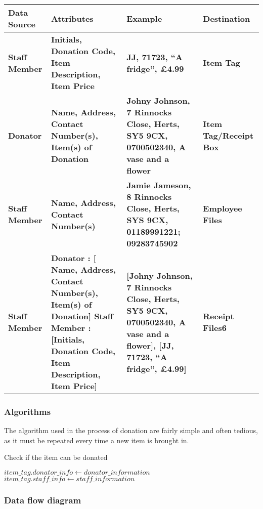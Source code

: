     \begin{tabular}{|p{3cm}|p{4cm}|p{4cm}|p{2cm}|}
        \hline
        \textbf{Data Source} & \textbf{Attributes} & \textbf{Example} & \textbf{Destination}\\ \hline 
        \textbf{Staff Member} & \textbf{Initials, Donation Code, Item Description, Item Price} & \textbf{JJ, 71723, “A fridge”, £4.99} & \textbf{Item Tag}\\ \hline 
        \textbf{Donator} & \textbf{Name, Address, Contact Number(s), Item(s) of Donation} & \textbf{Johny Johnson, 7 Rinnocks Close, Herts, SY5 9CX, 0700502340, A vase and a flower} & \textbf{Item Tag/Receipt Box}\\ \hline
        \textbf{Staff Member} & \textbf{Name, Address, Contact Number(s)} & \textbf{Jamie Jameson, 8 Rinnocks Close, Herts, SYS 9CX, 01189991221; 09283745902} & \textbf{Employee Files}\\ \hline
        \textbf{Staff Member} & \textbf{Donator : [ Name, Address, Contact Number(s), Item(s) of Donation] Staff Member : [Initials, Donation Code, Item Description, Item Price] } & \textbf{[Johny Johnson, 7 Rinnocks Close, Herts, SY5 9CX, 0700502340, A vase and a flower], [JJ, 71723, “A fridge”, £4.99]} & \textbf{Receipt Files6}\\ \hline 
    \end{tabular}

\subsubsection{Algorithms}
The algorithm used in the process  of donation are fairly simple and often tedious, as it must be repeated every time a new item is brought in.


\begin{algorithm}[H]
    \caption{Check if the item can be donated}
\begin{algorithmic}[1]
\EndFunction
\Else
\State $item\_tag.donator\_info \gets  donator\_information$
\State $item\_tag.staff\_info \gets  staff\_information$
\EndIf
\end{algorithmic}
\end{algorithm}

\subsubsection{Data flow diagram}

